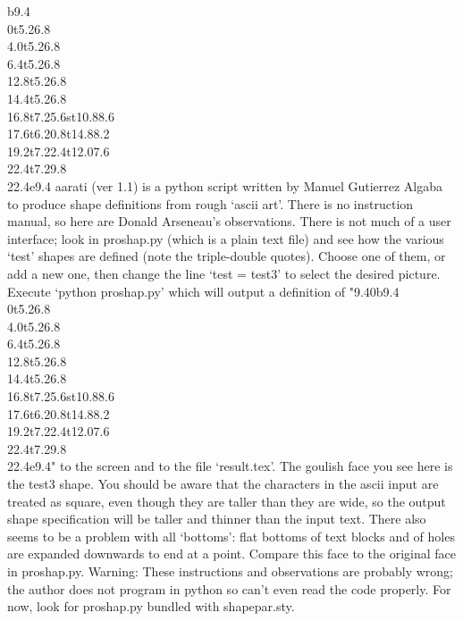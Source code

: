 \documentclass[draft]{article}
\begin{document}
\begin{minipage}{0.2\textwidth}

\gdef\bassshape{{9.4}{0}b{9.4}
\\{0}t{5.2}{6.8}
\\{4.0}t{5.2}{6.8}
\\{6.4}t{5.2}{6.8}
\\{12.8}t{5.2}{6.8}
\\{14.4}t{5.2}{6.8}
\\{16.8}t{7.2}{5.6}st{10.8}{8.6}
\\{17.6}t{6.2}{0.8}t{14.8}{8.2}
\\{19.2}t{7.2}{2.4}t{12.0}{7.6}
\\{22.4}t{7.2}{9.8}
\\{22.4}e{9.4}}

\shapepar\bassshape
aarati (ver 1.1) is a python script written by Man\-uel
Gu\-ti\-er\-rez Al\-ga\-ba to produce shape definitions from rough
`ascii art'.  There is no instruction manual, so here are Donald
Arseneau's observations. There is not much of a user interface; look
in proshap.py (which is a plain text file) and see how the various
`test' shapes are defined (note the triple-double quotes).  Choose
one of them, or add a new one, then change the line `test = test3' to select
the desired picture.  Execute `python proshap.py' which will output a
definition of "\bassshape" to the screen and to the file `result.tex'.
The goul\-ish face you see here is the test3 shape.  You should be
aware that the characters in the ascii input are treated as square,
even though they are taller than they are wide, so the output shape
specification will be taller and thinner than the input text.  There
also seems to be a problem with all `bottoms': flat bottoms of text
blocks and of holes are expanded downwards to end at a point.  Compare
this face to the original face in proshap.py.  Warning: These
instructions and observations are probably wrong; the author does not
program in python so can't even read the code properly.  For now, look
for proshap.py bundled with shapepar.sty.
\end{minipage}
\end{document}
